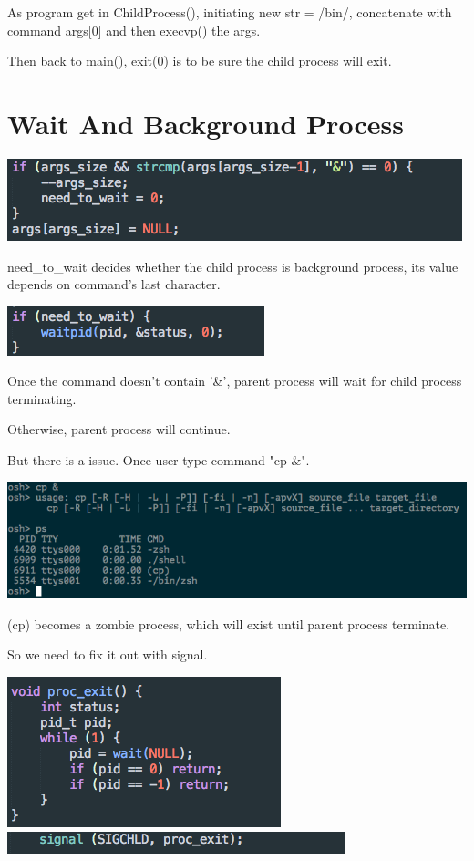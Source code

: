 \documentclass{article}
\begin{document}
As program get in ChildProcess(), initiating new str = /bin/, concatenate with command args[0] and then 
execvp() the args.

Then back to main(), exit(0) is to be sure the child process will exit.

\section{Wait And Background Process}

\includegraphics[scale=0.5]{pics/4.png}

need\_to\_wait decides whether the child process is background process, its value depends on command's last character.

\includegraphics[scale=0.5]{pics/5.png}

Once the command doesn't contain '\&', parent process will wait for child process terminating.

Otherwise, parent process will continue.

But there is a issue. Once user type command "cp \&".

\includegraphics[scale=0.5]{pics/8.png}

(cp) becomes a zombie process, which will exist until parent process terminate.

So we need to fix it out with signal.

\includegraphics[scale=0.5]{pics/6.png}\\
\includegraphics[scale=0.5]{pics/7.png}
\end{document}
